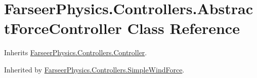 \hypertarget{class_farseer_physics_1_1_controllers_1_1_abstract_force_controller}{\section{Farseer\+Physics.\+Controllers.\+Abstract\+Force\+Controller Class Reference}
\label{class_farseer_physics_1_1_controllers_1_1_abstract_force_controller}
}


Inherits \hyperlink{class_farseer_physics_1_1_controllers_1_1_controller}{Farseer\+Physics.\+Controllers.\+Controller}.



Inherited by \hyperlink{class_farseer_physics_1_1_controllers_1_1_simple_wind_force}{Farseer\+Physics.\+Controllers.\+Simple\+Wind\+Force}.

